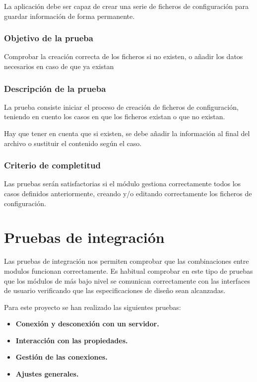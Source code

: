 La aplicación debe ser capaz de crear una serie de ficheros de configuración para guardar información de forma permanente.

\subsubsection{Objetivo de la prueba}

Comprobar la creación correcta de los ficheros si no existen, o añadir los datos necesarios en caso de que ya existan

\subsubsection{Descripción de la prueba}

La prueba consiste iniciar el proceso de creación de ficheros de configuración, teniendo en cuento los casos en que los ficheros existan o que no existan.

Hay que tener en cuenta que si existen, se debe añadir la información al final del archivo o sustituir el contenido según el caso.


\subsubsection{Criterio de completitud}

Las pruebas serán satisfactorias si el módulo gestiona correctamente todos los casos definidos anteriormente, creando y/o editando correctamente los ficheros de configuración.

\newpage
\section{Pruebas de integración}

Las pruebas de integración nos permiten comprobar que las combinaciones entre modulos funcionan correctamente. Es habitual comprobar en este tipo de pruebas que los módulos de más bajo nivel se comunican correctamente con las interfaces de usuario verificando que las especificaciones de diseño sean alcanzadas.

Para este proyecto se han realizado las siguientes pruebas:

\begin{itemize}
  \item \textbf{Conexión y desconexión con un servidor.}
  \item \textbf{Interacción con las propiedades.}
  \item \textbf{Gestión de las conexiones.}
  \item \textbf{Ajustes generales.}
\end{itemize}




